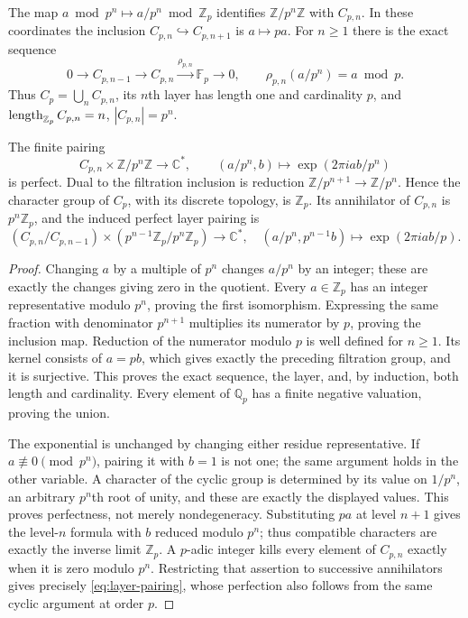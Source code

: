 \begin{theorem}
\label{thm:prime-filtration}
The map $a\bmod p^n\mapsto a/p^n\bmod\mathbb Z_p$ identifies
$\mathbb Z/p^n\mathbb Z$ with $C_{p,n}$. In these coordinates the
inclusion $C_{p,n}\hookrightarrow C_{p,n+1}$ is $a\mapsto pa$.
For $n\ge1$ there is the exact sequence
\[
 0\longrightarrow C_{p,n-1}\longrightarrow C_{p,n}
 \xrightarrow{\rho_{p,n}}\mathbb F_p\longrightarrow0,
 \qquad \rho_{p,n}(a/p^n)=a\bmod p.
 \tag{RP28}\label{eq:graded-sequence}
\]
Thus $C_p=\bigcup_n C_{p,n}$, its $n$th layer has length one and
cardinality $p$, and $\operatorname{length}_{\mathbb Z_p}C_{p,n}=n$,
$|C_{p,n}|=p^n$.

The finite pairing
\[
 C_{p,n}\times\mathbb Z/p^n\mathbb Z\longrightarrow\mathbb C^*,
 \qquad (a/p^n,b)\longmapsto\exp(2\pi i ab/p^n)
 \tag{RP29}\label{eq:finite-prime-pairing}
\]
is perfect. Dual to the filtration inclusion is reduction
$\mathbb Z/p^{n+1}\to\mathbb Z/p^n$. Hence the character group of
$C_p$, with its discrete topology, is $\mathbb Z_p$. Its annihilator
of $C_{p,n}$ is $p^n\mathbb Z_p$, and the induced perfect layer pairing
is
\[
 (C_{p,n}/C_{p,n-1})\times
 (p^{n-1}\mathbb Z_p/p^n\mathbb Z_p)\longrightarrow\mathbb C^*,
 \quad (a/p^n,p^{n-1}b)\longmapsto\exp(2\pi i ab/p).
 \tag{RP30}\label{eq:layer-pairing}
\]
\end{theorem}
\begin{proof}
Changing $a$ by a multiple of $p^n$ changes $a/p^n$ by an integer;
these are exactly the changes giving zero in the quotient. Every
$a\in\mathbb Z_p$ has an integer representative modulo $p^n$, proving
the first isomorphism. Expressing the same fraction with denominator
$p^{n+1}$ multiplies its numerator by $p$, proving the inclusion map.
Reduction of the numerator modulo $p$ is well defined for $n\ge1$.
Its kernel consists of $a=pb$, which gives exactly the preceding
filtration group, and it is surjective. This proves the exact sequence,
the layer, and, by induction, both length and cardinality. Every element
of $\mathbb Q_p$ has a finite negative valuation, proving the union.

The exponential is unchanged by changing either residue representative.
If $a\not\equiv0\pmod{p^n}$, pairing it with $b=1$ is not one; the
same argument holds in the other variable. A character of the cyclic
group is determined by its value on $1/p^n$, an arbitrary $p^n$th
root of unity, and these are exactly the displayed values. This proves
perfectness, not merely nondegeneracy. Substituting $pa$ at level $n+1$
gives the level-$n$ formula with $b$ reduced modulo $p^n$; thus compatible
characters are exactly the inverse limit $\mathbb Z_p$. A $p$-adic
integer kills every element of $C_{p,n}$ exactly when it is zero
modulo $p^n$. Restricting that assertion to successive annihilators
gives precisely \eqref{eq:layer-pairing}, whose perfection also follows
from the same cyclic argument at order $p$.
\end{proof}

